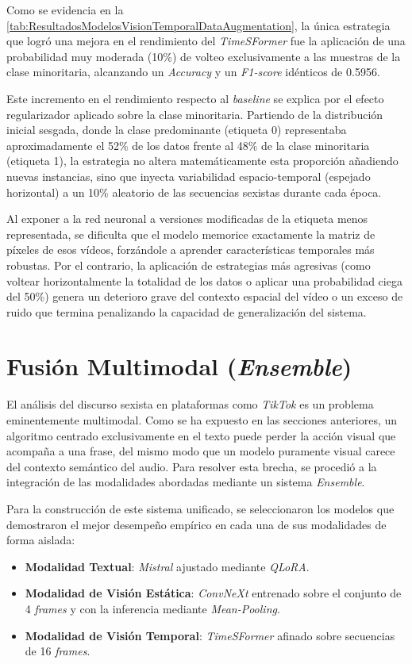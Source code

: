 Como se evidencia en la \autoref{tab:ResultadosModelosVisionTemporalDataAugmentation}, la única estrategia que logró una mejora en el rendimiento del \textit{TimeSFormer} fue la aplicación de una probabilidad muy moderada (10\%) de volteo exclusivamente a las muestras de la clase minoritaria, alcanzando un \textit{Accuracy} y un \textit{F1-score} idénticos de 0.5956.

Este incremento en el rendimiento respecto al \textit{baseline} se explica por el efecto regularizador aplicado sobre la clase minoritaria. Partiendo de la distribución inicial sesgada, donde la clase predominante (etiqueta 0) representaba aproximadamente el 52\% de los datos frente al 48\% de la clase minoritaria (etiqueta 1), la estrategia no altera matemáticamente esta proporción añadiendo nuevas instancias, sino que inyecta variabilidad espacio-temporal (espejado horizontal) a un 10\% aleatorio de las secuencias sexistas durante cada época.

Al exponer a la red neuronal a versiones modificadas de la etiqueta menos representada, se dificulta que el modelo memorice exactamente la matriz de píxeles de esos vídeos, forzándole a aprender características temporales más robustas. Por el contrario, la aplicación de estrategias más agresivas (como voltear horizontalmente la totalidad de los datos o aplicar una probabilidad ciega del 50\%) genera un deterioro grave del contexto espacial del vídeo o un exceso de ruido que termina penalizando la capacidad de generalización del sistema.

\section{Fusión Multimodal (\textit{Ensemble})}
\label{sec:FusionMultimodalEnsemble}
El análisis del discurso sexista en plataformas como \textit{TikTok} es un problema eminentemente multimodal. Como se ha expuesto en las secciones anteriores, un algoritmo centrado exclusivamente en el texto puede perder la acción visual que acompaña a una frase, del mismo modo que un modelo puramente visual carece del contexto semántico del audio. Para resolver esta brecha, se procedió a la integración de las modalidades abordadas mediante un sistema \textit{Ensemble}.

Para la construcción de este sistema unificado, se seleccionaron los modelos que demostraron el mejor desempeño empírico en cada una de sus modalidades de forma aislada: 
\begin{itemize}
    \item \textbf{Modalidad Textual}: \textit{Mistral} ajustado mediante \textit{QLoRA}.
    \item \textbf{Modalidad de Visión Estática}: \textit{ConvNeXt} entrenado sobre el conjunto de 4 \textit{frames} y con la inferencia mediante \textit{Mean-Pooling}.
    \item \textbf{Modalidad de Visión Temporal}: \textit{TimeSFormer} afinado sobre secuencias de 16 \textit{frames}. 
\end{itemize}

